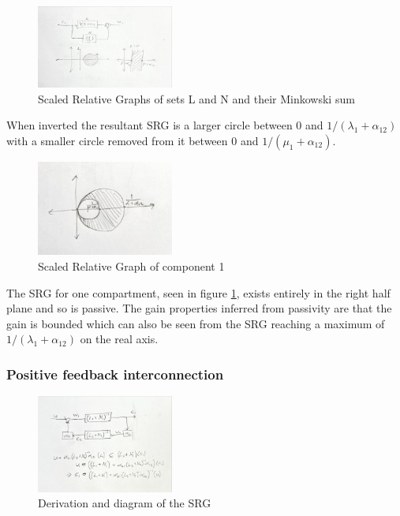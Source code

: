 \documentclass{article}
\begin{document}
\begin{figure}[H]
    \centering
    \includegraphics[width=0.4\textwidth]{figures/componentSRGs.jpg}
    \caption{Scaled Relative Graphs of sets L and N and their Minkowski sum}
\end{figure}
When inverted the resultant SRG is a larger circle between 0 and $1/(\lambda_1 + \alpha_{12})$ with a smaller circle removed from it between 0 and $1/(\mu_1 + \alpha_{12})$.
\begin{figure}[H]
    \centering
    \includegraphics[width=0.4\textwidth]{figures/compartmentSRG.jpg}
    \caption{Scaled Relative Graph of component 1}
    \label{fig:compartment_srg}
\end{figure}

The SRG for one compartment, seen in figure \ref{fig:compartment_srg}, exists entirely in the right half plane and so is passive.
The gain properties inferred from passivity are that the gain is bounded which can also be seen from the SRG reaching a maximum of $1/(\lambda_1 + \alpha_{12})$ on the real axis.

\subsubsection{Positive feedback interconnection}

\begin{figure}[H]
    \centering
    \includegraphics[width=0.4\textwidth]{figures/feedback_components.jpg}
    \caption{Derivation and diagram of the SRG }
\end{figure}
\end{document}
